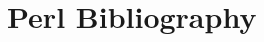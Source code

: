\documentclass{article}
\begin{document}
\section*{Perl Bibliography}
\nocite{*}




\end{document}
